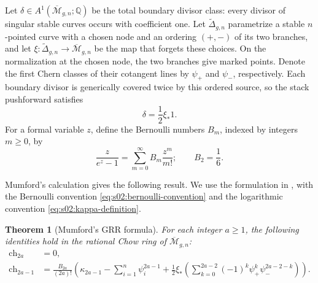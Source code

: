 \documentclass[a4paper,10pt]{article}
\numberwithin{equation}{section}
\newcommand{\MM}{\overline{\mathcal{M}}}
\theoremstyle{paperplain}
\newtheorem{thm}{Theorem}[section]
\theoremstyle{paperremark}
\theoremstyle{paperplain}
\begin{document}
Let $\delta\in A^1(\MM_{g,n};\mathbb Q)$ be the total boundary
divisor class: every divisor of singular stable curves occurs with
coefficient one.  Let $\widetilde\Delta_{g,n}$ parametrize a stable
$n$-pointed curve with a chosen node and an ordering $(+,-)$ of its two
branches, and let $\xi:\widetilde\Delta_{g,n}\to\MM_{g,n}$ be the
map that forgets these choices.  On the normalization at the chosen
node, the two branches give marked points.  Denote the first Chern
classes of their cotangent lines by $\psi_+$ and $\psi_-$,
respectively.  Each boundary divisor is generically covered twice by this ordered
source, so the stack pushforward satisfies
\begin{equation}
\label{eq:s02:ordered-boundary}
\delta=\frac12\xi_*1.
\end{equation}
For a formal variable $z$, define the Bernoulli numbers
$B_m$, indexed by integers $m\geq0$, by
\begin{equation}
\label{eq:s02:bernoulli-convention}
\frac{z}{e^z-1}=\sum_{m=0}^{\infty}B_m\frac{z^m}{m!};
\qquad B_2=\frac16.
\end{equation}

Mumford's calculation \cite[\S 5, (5.2)--(5.3)]{Mum83} gives the
following result.  We use the formulation in
\cite[\S 1.1, Theorem (Mumford)]{FP00}, with the Bernoulli convention
\eqref{eq:s02:bernoulli-convention} and the logarithmic convention
\eqref{eq:s02:kappa-definition}.

\begin{thm}[Mumford's GRR formula]
\label{thm:s02:grr}
For each integer $a\geq1$, the following identities hold in the
rational Chow ring of $\MM_{g,n}$:
\begin{equation}
\label{eq:s02:grr}
\begin{split}
\mathrm{ch}_{2a}&=0,\\
\mathrm{ch}_{2a-1}
&=\frac{B_{2a}}{(2a)!}
\left(
\kappa_{2a-1}-\sum_{i=1}^n\psi_i^{2a-1}
+\frac12\xi_*\!\left(
\sum_{k=0}^{2a-2}(-1)^k\psi_+^k\psi_-^{2a-2-k}
\right)\right).
\end{split}
\end{equation}
\end{thm}
\end{document}
